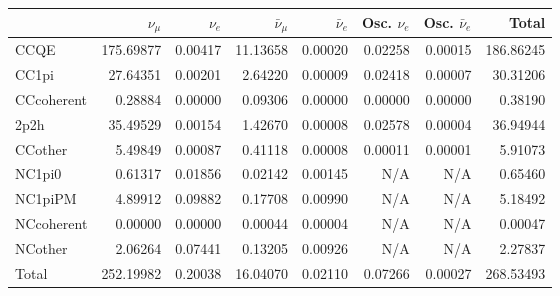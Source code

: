 \begin{tabular} { | l ||r | r | r | r | r | r | | r | }
\hline
              & $\nu_\mu$            & $\nu_e$              & $\bar{\nu}_{\mu}$    & $\bar{\nu}_{e}$      & Osc. $\nu_e$         & Osc. $\bar{\nu}_{e}$ & Total                \\ \hline\hline
 CCQE         & 175.69877            & 0.00417              & 11.13658             & 0.00020              & 0.02258              & 0.00015              & 186.86245            \\ \hline
 CC1pi        & 27.64351             & 0.00201              & 2.64220              & 0.00009              & 0.02418              & 0.00007              & 30.31206             \\ \hline
 CCcoherent   & 0.28884              & 0.00000              & 0.09306              & 0.00000              & 0.00000              & 0.00000              & 0.38190              \\ \hline
 2p2h         & 35.49529             & 0.00154              & 1.42670              & 0.00008              & 0.02578              & 0.00004              & 36.94944             \\ \hline
 CCother      & 5.49849              & 0.00087              & 0.41118              & 0.00008              & 0.00011              & 0.00001              & 5.91073              \\ \hline
 NC1pi0       & 0.61317              & 0.01856              & 0.02142              & 0.00145              & N/A                  & N/A                  & 0.65460              \\ \hline
 NC1piPM      & 4.89912              & 0.09882              & 0.17708              & 0.00990              & N/A                  & N/A                  & 5.18492              \\ \hline
 NCcoherent   & 0.00000              & 0.00000              & 0.00044              & 0.00004              & N/A                  & N/A                  & 0.00047              \\ \hline
 NCother      & 2.06264              & 0.07441              & 0.13205              & 0.00926              & N/A                  & N/A                  & 2.27837              \\ \hline
\hline
 Total        & 252.19982            & 0.20038              & 16.04070             & 0.02110              & 0.07266              & 0.00027              & 268.53493            \\ \hline

\end{tabular}
